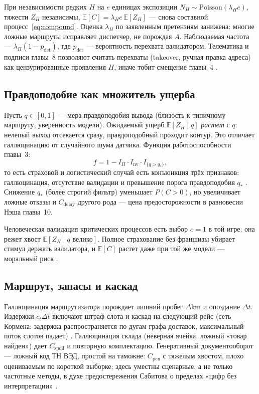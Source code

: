 \documentclass[a4paper,14pt]{extarticle}
\begin{document}
При независимости редких $H$ на $e$ единицах экспозиции $N_H\sim\mathrm{Poisson}(\lambda_H e)$, тяжести $Z_H$ независимы, $\mathbb{E}[C]=\lambda_H e\,\mathbb{E}[Z_H]$ --- снова составной процесс~\eqref{eq:compound}. Оценка $\lambda_H$ по заявленным претензиям занижена: многие ложные маршруты исправляет диспетчер, не порождая $A$. Наблюдаемая частота --- $\lambda_H(1-p_{\mathrm{det}})$, где $p_{\mathrm{det}}$ --- вероятность перехвата валидатором. Телематика и подписи главы~8 позволяют считать перехваты (takeover, ручная правка адреса) как цензурированные проявления $H$, иначе тобит-смещение главы~4 \cite{verbeek}.

\subsection{Правдоподобие как множитель ущерба}

Пусть $q\in[0,1]$ --- мера правдоподобия вывода (близость к типичному маршруту, уверенность модели). Ожидаемый ущерб $\mathbb{E}[Z_H\mid q]$ \emph{растет} с $q$: нелепый выход отсекается сразу, правдоподобный проходит контур. Это отличает галлюцинацию от случайного шума датчика. Функция работоспособности главы~3:
\[
f=1-I_H\cdot I_{\mathrm{nv}}\cdot I_{\{q>q_*\}},
\]
то есть страховой и логистический случай есть конъюнкция трёх признаков: галлюцинация, отсутствие валидации и превышение порога правдоподобия $q_*$ \cite{yablonsky}. Снижение $q_*$ (более строгий фильтр) уменьшает $P(C>0)$, но увеличивает ложные отказы и $C_{\mathrm{delay}}$ другого рода --- цена предосторожности в равновесии Нэша главы~10.

Человеческая валидация критических процессов \cite{cbr} есть выбор $e=1$ в той игре: она режет хвост $\mathbb{E}[Z_H\mid q\text{ велико}]$. Полное страхование без франшизы убирает стимул держать валидатора, и $\mathbb{E}[C]$ растет даже при той же модели --- моральный риск \cite{pindyck}.

\subsection{Маршрут, запасы и каскад}

Галлюцинация маршрутизатора порождает лишний пробег $\Delta\mathrm{km}$ и опоздание $\Delta t$. Издержки $c_t\Delta t$ включают штраф слота и каскад на следующий рейс (сеть Кормена: задержка распространяется по дугам графа доставок, максимальный поток слотов падает) \cite{cormen}. Галлюцинация склада (неверная ячейка, ложный «товар найден») дает $C_{\mathrm{spoil}}$ и повторную комплектацию. Генеративный документооборот --- ложный код ТН ВЭД, простой на таможне: $C_{\mathrm{pen}}$ с тяжелым хвостом, плохо оцениваемым по короткой выборке; здесь уместны сценарные, а не только частотные методы, в духе предостережения Сабитова о пределах «цифр без интерпретации» \cite{sabitov}.
\end{document}
